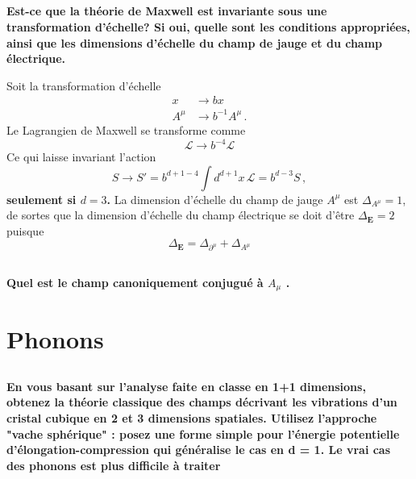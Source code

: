 \documentclass{article}
\numberwithin{equation}{section}
\theoremstyle{solution}
\begin{document}


\subsection{}
\textbf{Est-ce que la théorie de Maxwell est invariante sous une transformation d’échelle? Si
oui, quelle sont les conditions appropriées, ainsi que les dimensions d’échelle du champ de jauge
et du champ électrique.}
\vspace{2ex}

Soit la transformation d'échelle
\begin{equation}
\begin{split}
        x &\rightarrow  bx \\
        A^{\mu} &\rightarrow b^{-1}A^{\mu}\,. 
\end{split}
\end{equation} 
Le Lagrangien de Maxwell se transforme comme
\begin{equation}
        \mathcal{L} \rightarrow b^{-4}\mathcal{L}
\end{equation} 
Ce qui laisse invariant l'action
\begin{equation}
        S \rightarrow S' =  b^{d+1 - 4}\int d^{d+1}x \,\mathcal{L} = b^{d-3}S\, ,
\end{equation} 
\textbf{seulement si $\boxed{d=3}$.} La dimension d'échelle du champ de jauge $A^{\mu}$ est $\boxed{\Delta_{A^{\mu}} = 1}$, de sortes que la 
dimension d'échelle du champ électrique se doit d'être $\boxed{\Delta_{\mathbf{E}} = 2}$ puisque
\begin{equation}
        \Delta_{\mathbf{E}} = \Delta_{\partial^{\mu}} + \Delta_{A^{\mu}}
\end{equation} 



\subsection{}
\textbf{Quel est le champ canoniquement conjugué à $A_\mu$ . 
\vspace{2ex}
}

\section{Phonons}
\subsection{}
\textbf{En vous basant sur l’analyse faite en classe en 1+1 dimensions, obtenez la théorie classique des champs décrivant les vibrations d’un cristal cubique en 2 et 3 dimensions spatiales.
Utilisez l’approche "vache sphérique" : posez une forme simple pour l’énergie potentielle
d’élongation-compression qui généralise le cas en d = 1. Le vrai cas des phonons est plus
difficile à traiter}
\end{document}
